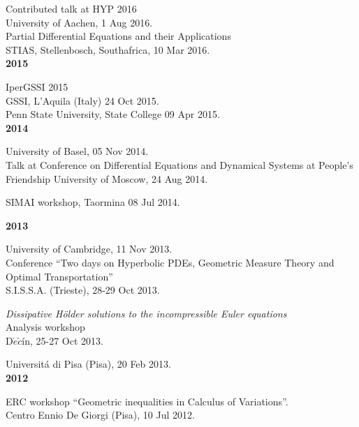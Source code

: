 \documentclass[10pt]{article}
\newcommand{\blankline}{\quad\pagebreak[2]}
\begin{document}
Contributed talk at HYP 2016\\
University of Aachen, 1 Aug 2016.\\


Partial Differential Equations and their Applications\\
STIAS, Stellenbosch, Southafrica, 10 Mar 2016.\\



\textbf{2015}\\
\blankline

IperGSSI 2015\\
GSSI, L'Aquila (Italy) 24 Oct 2015.\\

Penn State University, State College 09 Apr 2015.\\



\textbf{2014}\\
\blankline

University of Basel, 05 Nov 2014.\\

Talk at Conference on Differential Equations and Dynamical Systems at People's Friendship University of Moscow, 24 Aug 2014.\\
\blankline

SIMAI workshop, Taormina 08 Jul 2014.\\
\blankline

\textbf{2013}\\
\blankline

University of Cambridge, 11 Nov 2013. \\

Conference ``Two days on Hyperbolic PDEs, Geometric Measure Theory and Optimal Transportation''\\
S.I.S.S.A. (Trieste), 28-29 Oct 2013.\\
\blankline

\emph{Dissipative H\"older solutions to the incompressible Euler equations}\\
Analysis workshop\\
D$\check{e}\check{c}$\'in, 25-27 Oct 2013.\\
\blankline

Universit\'a di Pisa (Pisa), 20 Feb 2013.\\



\textbf{2012}\\
\blankline

ERC workshop ``Geometric inequalities in Calculus of Variations''.\\
Centro Ennio De Giorgi (Pisa), 10 Jul 2012.\\
\blankline
\end{document}

